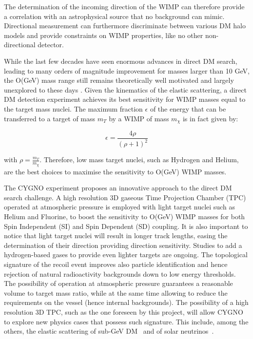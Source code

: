 \documentclass[physics,article,submit,moreauthors,pdftex]{Definitions/mdpi}
\begin{document}
The determination of the incoming direction of the WIMP can therefore provide a correlation with an astrophysical source \cite{Mayet:2016zxu} that no background can mimic. Directional measurement can furthermore discriminate between various DM halo models and provide constraints on WIMP properties, like no other non-directional detector\cite{Mayet:2016zxu}. 

While the last few decades have seen enormous advances in direct DM search, leading to many orders of magnitude improvement for masses larger than 10 GeV, the O(GeV) mass range still remains theoretically well motivated and largely unexplored to these days \cite{bib:zurek}.
Given the kinematics of the elastic scattering, a direct DM detection experiment achieves its best sensitivity for WIMP masses equal to the target mass nuclei. The maximum fraction $\epsilon$ of the energy that can be transferred to a target of mass $m_T$ by a WIMP of mass $m_{\chi}$ is in fact given by:

\begin{equation}
\epsilon = \frac {4 \rho}{\left( \rho + 1 \right)^2}
\label{eq:eps}
\end{equation}

with $\rho = \frac{m_T}{m_{\chi}}$. Therefore, low mass target nuclei, such as Hydrogen and Helium, are the best choices to maximise the sensitivity to O(GeV) WIMP masses. 



The CYGNO experiment proposes an innovative approach to the direct DM search challenge. A high resolution 3D gaseous Time Projection Chamber (TPC) operated at atmospheric pressure is employed with light target nuclei such as Helium and Fluorine, to boost the sensitivity to O(GeV) WIMP masses for both Spin Independent (SI) and Spin Dependent (SD) coupling. It is also important to notice that light target nuclei will result in longer track lengths, easing the determination of their direction providing direction sensitivity. Studies to add a hydrogen-based gases to provide even lighter targets are ongoing.
The topological signature of the recoil event improves also particle identification and hence rejection of natural radioactivity backgrounds down to low energy thresholds. The possibility of operation at atmospheric pressure  guarantees a reasonable volume to target mass ratio, while at the same time allowing to reduce the requirements on the vessel (hence internal backgrounds). 
The possibility of a high resolution 3D TPC, such as the one foreseen by this project,  will allow CYGNO to explore new physics cases that possess such signature. This include, among the others, the elastic scattering of sub-GeV DM~\cite{Baracchini:2020owr} and of solar neutrinos~\cite{Seguinot:1992zu,Arpesella:1996uc}.
\end{document}
